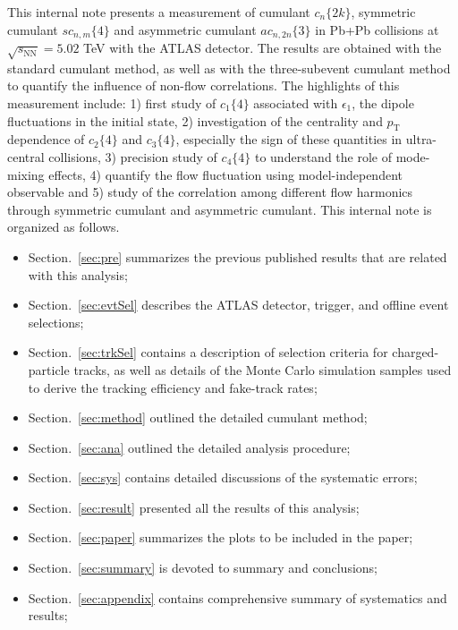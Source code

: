 This internal note presents a measurement of cumulant $c_n\{2k\}$, symmetric cumulant $sc_{n,m}\{4\}$ and asymmetric cumulant $ac_{n,2n}\{3\}$ in Pb+Pb collisions at $\sqrt{s_\text{NN}}=5.02$ TeV with the ATLAS detector. The results are obtained with the standard cumulant method, as well as with the three-subevent cumulant method to quantify the influence of non-flow correlations. The highlights of this measurement include: 1) first study of $c_1\{4\}$ associated with $\epsilon_1$, the dipole fluctuations in the initial state, 2) investigation of the centrality and $p_\text{T}$ dependence of $c_2\{4\}$ and $c_3\{4\}$, especially the sign of these quantities in ultra-central collisions, 3) precision study of $c_4\{4\}$ to understand the role of mode-mixing effects, 4) quantify the flow fluctuation using model-independent observable and 5) study of the correlation among different flow harmonics through symmetric cumulant and asymmetric cumulant. This internal note is organized as follows.
\begin{itemize}
\item Section.~\ref{sec:pre} summarizes the previous published results that are related with this analysis;
\item Section.~\ref{sec:evtSel} describes the ATLAS detector, trigger, and offline event selections;
\item Section.~\ref{sec:trkSel} contains a description of selection criteria for charged-particle tracks, as well as details of the Monte Carlo simulation samples used to derive the tracking efficiency and fake-track rates;
\item Section.~\ref{sec:method} outlined the detailed cumulant method;
\item Section.~\ref{sec:ana} outlined the detailed analysis procedure;
\item Section.~\ref{sec:sys} contains detailed discussions of the systematic errors;
\item Section.~\ref{sec:result} presented all the results of this analysis;
\item Section.~\ref{sec:paper} summarizes the plots to be included in the paper;
\item Section.~\ref{sec:summary} is devoted to summary and conclusions;
\item Section.~\ref{sec:appendix} contains comprehensive summary of systematics and results;
\end{itemize}



